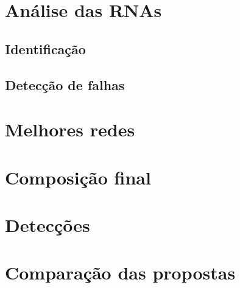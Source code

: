 \section{Análise das RNAs}

\subsection{Identificação}

\subsection{Detecção de falhas}

\section{Melhores redes}

\section{Composição final}

\section{Detecções}

\section{Comparação das propostas}
